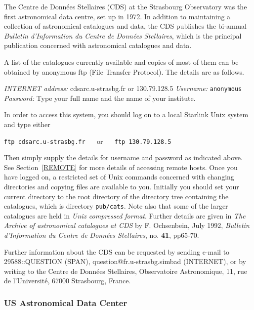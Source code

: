 \documentclass[twoside,11pt,nolof]{starlink}
\begin{document}
The Centre de Donn\'{e}es Stellaires (CDS) at the Strasbourg Observatory
was the first astronomical data centre, set up in 1972. In addition to
maintaining a collection of astronomical catalogues and data, the CDS
publishes the bi-annual \textit{Bulletin d'Information du Centre de
Donn\'{e}es Stellaires}, which is the principal publication concerned
with astronomical catalogues and data.

A list of the catalogues currently available and copies of most of them
can be obtained by anonymous ftp (File Transfer Protocol). The details
are as follows.

\textit{INTERNET address: } cdsarc.u-strasbg.fr or 130.79.128.5
\newline \textit{Username:} \verb-anonymous-
\newline \textit{Password:} Type your full name and the name of your
institute.

In order to access this system, you should log on to a local Starlink
Unix system and type either

\vspace{2.0 mm}
\verb:ftp cdsarc.u-strasbg.fr: ~~ or ~~ \verb:ftp 130.79.128.5:
\vspace{2.0 mm}

Then simply supply the details for username and password as indicated
above.  See Section~\ref{REMOTE} for more details of accessing remote
hosts. Once you have logged on, a restricted set of Unix commands
concerned with changing directories and copying files are available to
you. Initially you should set your current directory to the root
directory of the directory tree containing the catalogues, which is
directory \verb-pub/cats-. Note also that some of the larger catalogues
are held in \textit{Unix compressed format}. Further details are given in
\textit{The Archive of astronomical catalogues at CDS} by F. Ochsenbein,
July 1992, \textit{Bulletin d'Information du Centre de Donn\'{e}es
Stellaires}, no. \textbf{41}, pp65-70.

Further information about the CDS can be requested by sending e-mail
to 29588::QUESTION (SPAN), question@fr.u-strasbg.simbad (INTERNET), or
by writing to the Centre de Donn\'{e}es Stellaires, Observatoire
Astronomique, 11, rue de l'Universit\'{e}, 67000 Strasbourg, France.

\subsubsection{US Astronomical Data Center
\label{ADC}}
\end{document}

